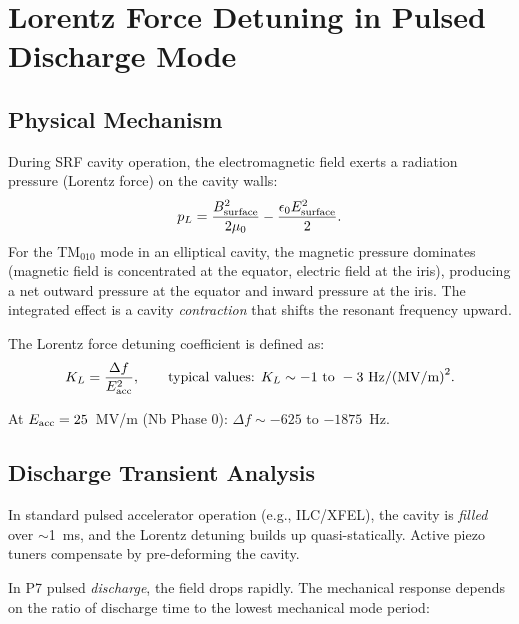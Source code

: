 \documentclass[11pt]{article}
\begin{document}
\section{Lorentz Force Detuning in Pulsed Discharge Mode}
\label{sec:LFD}

\subsection{Physical Mechanism}

During SRF cavity operation, the electromagnetic field exerts a
radiation pressure (Lorentz force) on the cavity walls:
\begin{equation}
p_L = \frac{B_{\rm surface}^2}{2\mu_0} - \frac{\epsilon_0 E_{\rm surface}^2}{2}.
\end{equation}
For the TM$_{010}$ mode in an elliptical cavity, the magnetic pressure
dominates (magnetic field is concentrated at the equator, electric
field at the iris), producing a net outward pressure at the equator
and inward pressure at the iris. The integrated effect is a cavity
\emph{contraction} that shifts the resonant frequency upward.

The Lorentz force detuning coefficient is defined as:
\begin{equation}
K_L = \frac{\Delta f}{E_{\rm acc}^2}, \qquad
\text{typical values: } K_L \sim -1 \text{ to } -3~\text{Hz/(MV/m)}^2.
\end{equation}

At $E_{\rm acc} = 25$~MV/m (Nb Phase 0): $\Delta f \sim -625$ to
$-1875$~Hz.

\subsection{Discharge Transient Analysis}

In standard pulsed accelerator operation (e.g., ILC/XFEL), the
cavity is \emph{filled} over $\sim$1~ms, and the Lorentz detuning
builds up quasi-statically. Active piezo tuners compensate by
pre-deforming the cavity.

In P7 pulsed \emph{discharge}, the field drops rapidly. The
mechanical response depends on the ratio of discharge time to
the lowest mechanical mode period:
\end{document}
